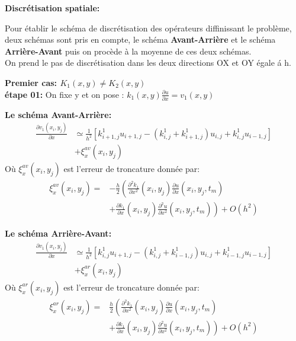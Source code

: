 \documentclass[12pt]{beamer}
\begin{document}
  \begin{frame}
  \textbf{Discr\'{e}tisation spatiale:}
 \begin{block}{}
 Pour \'{e}tablir le sch\'{e}ma de discr\'{e}tisation des op\'{e}rateurs diffinissant le probl\`{e}me,  deux  sch\'{e}mas sont pris en compte,  le sch\'{e}ma \textbf{Avant-Arri\`{e}re} et le sch\'{e}ma \textbf{Arri\`{e}re-Avant} puis on proc\`{e}de \`{a} la moyenne de ces deux sch\'{e}mas.\\ On prend le pas de discr\'{e}tisation dans les deux directions OX et OY \'{e}gale \'{a} h.\end{block}
\textbf{Premier cas: $K_{1}(x,y)\neq K_{2}(x,y)$}\\
\textbf{\'{e}tape 01:} On fixe y et on pose : $k_{1}(x,y)\frac{\partial{u}}{\partial{x}}=v_{1}(x,y)$
 \end{frame}
 	\begin{frame}
 	\begin{block}{}
 		 	\textbf{\large{Le sch\'{e}ma Avant-Arri\`{e}re:}}
 	\begin{align} \frac{\partial{v}_{1}(x_{i},y_{j})}{\partial{x}}&\simeq \frac{1}{h^{2}}[k^{1}_{i+1,j}u_{i+1,j}-(k^{1}_{i,j}+k^{1}_{i+1,j})u_{i,j}+k^{1}_{i,j}u_{i-1,j}]\nonumber\\&
 	+\xi^{av}_{x}(x_{i},y_{j}) \label{37*}\end{align}
 	O\`{u}  $\xi^{av}_{x}(x_{i},y_{j})$ est l'erreur de troncature donn\'{e}e par:
 	\begin{align}
 	\xi^{av}_{x}(x_{i},y_{j})=&-\frac{h}{2}\left( \frac{\partial^{2}{k}_{1}}{\partial{x^{2}}}(x_{i},y_{j})\frac{\partial{u}}{\partial{x}}(x_{i},y_{j},t_{m})\right. \nonumber\\&+\left. \frac{\partial{k_{1}}}{\partial{x}}(x_{i},y_{j})\frac{\partial^{2}{u}}{\partial{x^{2}}}(x_{i},y_{j},t_{m})\right) +O(h^{2})	\end{align}
 	 \end{block}
 \end{frame}
\begin{frame}
\begin{block}{}
 	\textbf{\large{Le sch\'{e}ma Arri\`{e}re-Avant:}}
 	\begin{align} \frac{\partial{v}_{1}(x_{i},y_{j})}{\partial{x}}&\simeq \frac{1}{h^{2}}[k^{1}_{i,j}u_{i+1,j}-(k^{1}_{i,j}+k^{1}_{i-1,j})u_{i,j}+k^{1}_{i-1,j}u_{i-1,j}]\nonumber\\&+\xi^{ar}_{x}(x_{i},y_{j}) \label{312*}\end{align}
 	O\`{u}  $\xi^{ar}_{x}(x_{i},y_{j})$ est l'erreur de troncature donn\'{e}e par:
 	\begin{align}\xi^{ar}_{x}(x_{i},y_{j})=&\frac{h}{2}\left( \frac{\partial^{2}{k}_{1}}{\partial{x^{2}}}(x_{i},y_{j})\frac{\partial{u}}{\partial{x}}(x_{i},y_{j},t_{m})\right. \nonumber\\&+\left. \frac{\partial{k_{1}}}{\partial{x}}(x_{i},y_{j})\frac{\partial^{2}{u}}{\partial{x^{2}}}(x_{i},y_{j},t_{m})\right) +O(h^{2}) \end{align}
 \end{block}
 	 \end{frame}
\end{document}
